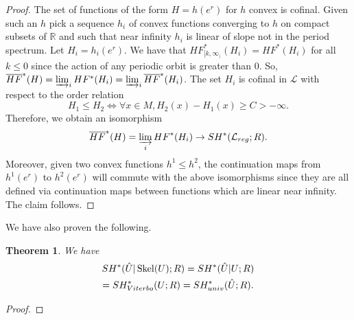 \documentclass[11pt]{amsart}
\newcommand{\R}{\mathbb{R}}
\DeclareMathOperator{\Skel}{Skel}
\newtheorem{tm}{Theorem}[section]
\theoremstyle{definition}
\theoremstyle{remark}
\begin{document}
\begin{proof}
The set of functions of the form $H=h(e^r)$ for $h$ convex is cofinal. Given such an $h$ pick a sequence $h_i$ of convex functions converging to $h$ on compact subsets of $\R$ and such that near infinity $h_i$ is linear of slope not in the period spectrum. Let $H_i=h_i(e^r)$. We have that $HF^*_{[k,\infty_)}(H_i)=HF^*(H_i)$ for all $k\leq 0$  since the action of any periodic orbit is greater than $0$. So, $\overline{HF}^*(H)=\varinjlim_iHF^*(H_i)=\varinjlim_i\overline{HF}^*(H_i)$. The set $H_i$ is cofinal in $\mathcal{L}$ with respect to the order relation
\[
H_1\leq H_2\iff \forall x\in M, H_2(x)-H_1(x)\geq C>-\infty.
\]
Therefore, we obtain an isomorphism
\[
\overline{HF}^*(H)=\varinjlim_i{HF}^*(H_i)\to SH^*(\mathcal{L}_{reg};R).
\]
Moreover, given two convex functions $h^1\leq h^2$, the continuation maps from $h^1(e^r)$ to $h^2(e^r)$ will commute with the above isomorphisms since they are all defined via continuation maps between functions which are linear near infinity. The claim follows.
\end{proof}
We have also proven the following.
\begin{tm}
We have
\begin{gather}
SH^*(\hat{U}|\Skel(U);R)=SH^*(\hat{U}|U;R)\notag\\
=SH^*_{Viterbo}(U;R)=SH^*_{univ}(\hat{U};R)\notag.
\end{gather}
\end{tm}
\begin{proof}

\end{proof}
\end{document}
